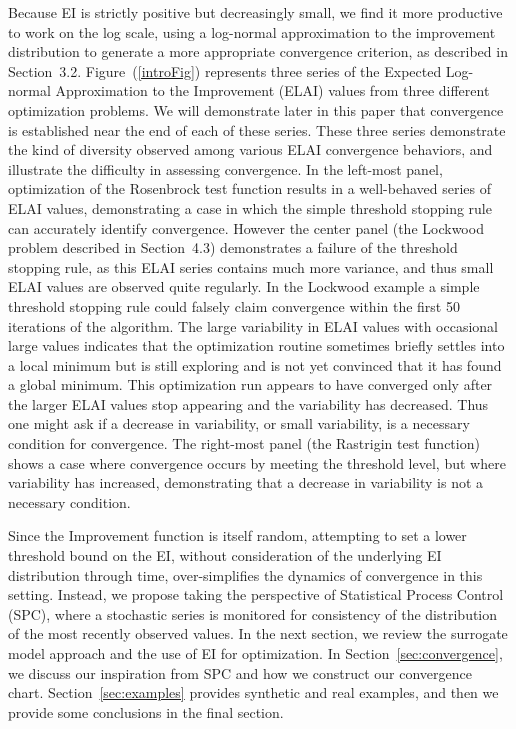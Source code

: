 \documentclass[AMA,Times1COL]{WileyNJDv5} %
\begin{document}
Because EI is strictly positive but decreasingly small, we find it more
productive to work on the log scale, using a log-normal approximation to the
improvement distribution to generate a more appropriate convergence criterion,
as described in Section~3.2. Figure~(\ref{introFig}) represents three series of
the Expected Log-normal Approximation to the Improvement (ELAI) values from
three different optimization problems. We will demonstrate later in this paper
that convergence is established near the end of each of these series. These
three series demonstrate the kind of diversity observed among various ELAI
convergence behaviors, and illustrate the difficulty in assessing convergence.
In the left-most panel, optimization of the Rosenbrock test function results in
a well-behaved series of ELAI values, demonstrating a case in which the simple
threshold stopping rule can accurately identify convergence.  However the center
panel (the Lockwood problem described in Section~4.3) demonstrates a failure of
the threshold stopping rule, as this ELAI series contains much more variance,
and thus small ELAI values are observed quite regularly. In the Lockwood example
a simple threshold stopping rule could falsely claim convergence within the
first 50 iterations of the algorithm. The large variability in ELAI values with
occasional large values indicates that the optimization routine sometimes
briefly settles into a local minimum but is still exploring and is not yet
convinced that it has found a global minimum. This optimization run appears to
have converged only after the larger ELAI values stop appearing and the
variability has decreased. Thus one might ask if a decrease in variability, or
small variability, is a necessary condition for convergence. The right-most
panel (the Rastrigin test function) shows a case where convergence occurs by
meeting the threshold level, but where variability has increased, demonstrating
that a decrease in variability is not a necessary condition.

%
%

%
Since the Improvement function is itself random, attempting to set a lower
threshold bound on the EI, without consideration of the underlying EI
distribution through time, over-simplifies the dynamics of convergence in this
setting. Instead, we propose taking the perspective of Statistical Process
Control (SPC), where a stochastic series is monitored for consistency of the
distribution of the most recently observed values. In the next section, we
review the surrogate model approach and the use of EI for
optimization. In Section~\ref{sec:convergence}, we discuss our inspiration from
SPC and how we construct our convergence chart. Section~\ref{sec:examples}
provides synthetic and real examples, and then we provide some conclusions in
the final section.
\end{document}
